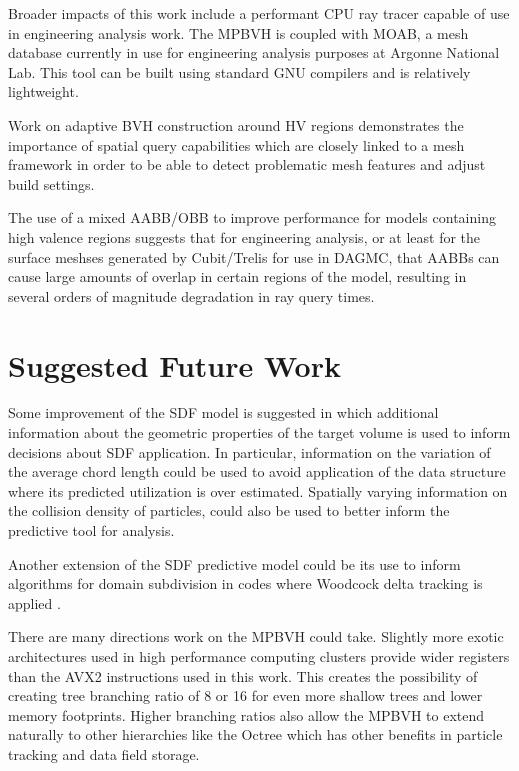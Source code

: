Broader impacts of this work include a performant CPU ray tracer capable of
use in engineering analysis work. The MPBVH is coupled with MOAB, a mesh
database currently in use for engineering analysis purposes at Argonne National
Lab. This tool can be built using standard GNU compilers and is relatively
lightweight.

Work on adaptive BVH construction around HV regions demonstrates the importance
of spatial query capabilities which are closely linked to a mesh framework in
order to be able to detect problematic mesh features and adjust build settings.

The use of a mixed AABB/OBB to improve performance for models containing high
valence regions suggests that for engineering analysis, or at least for the
surface meshses generated by Cubit/Trelis for use in DAGMC, that AABBs can cause
large amounts of overlap in certain regions of the model, resulting in several
orders of magnitude degradation in ray query times.

\section{Suggested Future Work}\label{sec:future_work}

Some improvement of the SDF model is suggested in which additional information
about the geometric properties of the target volume is used to inform decisions
about SDF application. In particular, information on the variation of the
average chord length could be used to avoid application of the data structure
where its predicted utilization is over estimated. Spatially varying information
on the collision density of particles, could also be used to better inform the
predictive tool for analysis.

Another extension of the SDF predictive model could be its use to inform
algorithms for domain subdivision in codes where Woodcock delta tracking is
applied \cite{Leppanen_2010} \cite{Yonghao_2011}. 

There are many directions work on the MPBVH could take. Slightly more exotic
architectures used in high performance computing clusters provide wider
registers than the AVX2 instructions used in this work. This creates the
possibility of creating tree branching ratio of 8 or 16 for even more shallow
trees and lower memory footprints. Higher branching ratios also allow the MPBVH
to extend naturally to other hierarchies like the Octree which has other
benefits in particle tracking and data field storage.

